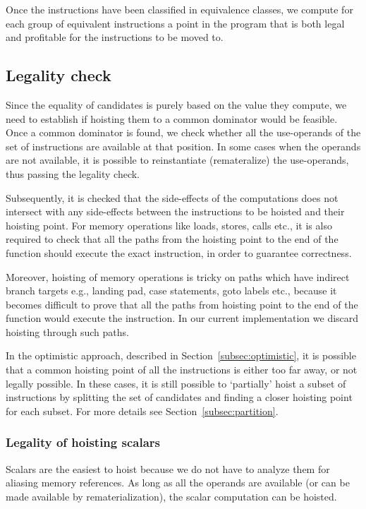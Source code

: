 \documentclass{sig-alternate}
\begin{document}
Once the instructions have been classified in equivalence classes, we compute
for each group of equivalent instructions a point in the program that is both
legal and profitable for the instructions to be moved to.

\subsection{Legality check}
\label{subsec:legality}
Since the equality of candidates is purely based on the value they compute, we
need to establish if hoisting them to a common dominator would be feasible. Once
a common dominator is found, we check whether all the use-operands of the set of
instructions are available at that position. In some cases when the operands are not
available, it is possible to reinstantiate (remateralize) the use-operands, thus
passing the legality check.

Subsequently, it is checked that the side-effects of the computations does not
intersect with any side-effects between the instructions to be hoisted and their
hoisting point. For memory operations like loads, stores, calls etc., it is also
required to check that all the paths from the hoisting point to the end of the
function should execute the exact instruction, in order to guarantee
correctness.

Moreover, hoisting of memory operations is tricky on paths which have indirect
branch targets e.g., landing pad, case statements, goto labels etc., because it
becomes difficult to prove that all the paths from hoisting point to the end of
the function would execute the instruction. In our current implementation we
discard hoisting through such paths.

In the optimistic approach, described in Section~\ref{subsec:optimistic}, it is
possible that a common hoisting point of all the instructions is either too far
away, or not legally possible. In these cases, it is still possible to
`partially' hoist a subset of instructions by splitting the set of candidates
and finding a closer hoisting point for each subset. For more details see
Section~\ref{subsec:partition}.

\subsubsection{Legality of hoisting scalars}
Scalars are the easiest to hoist because we do not have to analyze them for
aliasing memory references. As long as all the operands are available (or can be
made available by rematerialization), the scalar computation can be hoisted.
\end{document}
